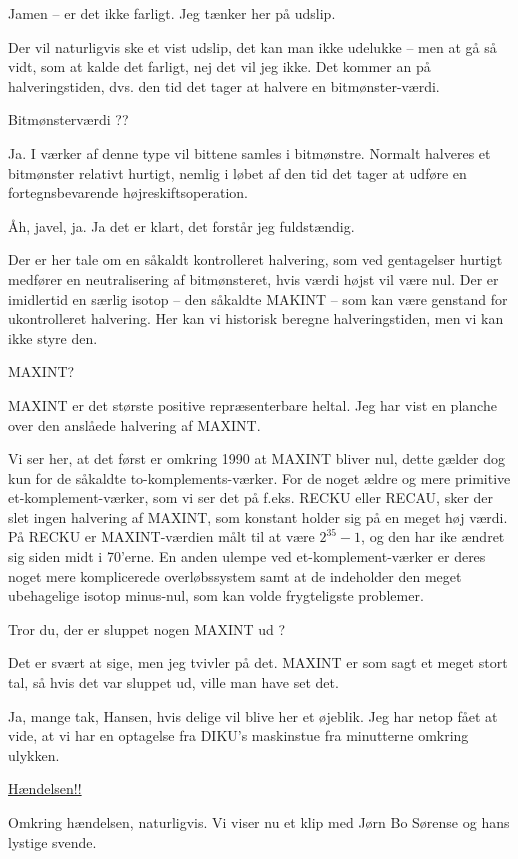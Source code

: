 \documentclass[a4paper,11pt]{article}
\begin{document}
\begin{sketch}
 Jamen -- er det ikke farligt. Jeg tænker her på udslip.

 Der vil naturligvis ske et vist udslip, det kan man ikke udelukke --
men at gå så vidt, som at kalde det farligt, nej det vil jeg ikke. Det kommer an
på halveringstiden, dvs. den tid det tager at halvere en bitmønster-værdi.

 Bitmønsterværdi ??

 Ja.  I værker af denne type vil bittene samles i bitmønstre. Normalt
halveres et bitmønster relativt hurtigt, nemlig i løbet af den tid det tager at
udføre en fortegnsbevarende højreskiftsoperation.

 Åh, javel, ja. Ja det er klart, det forstår jeg fuldstændig.

 Der er her tale om en såkaldt kontrolleret halvering, som ved
gentagelser hurtigt medfører en neutralisering af bitmønsteret, hvis værdi højst
vil være nul.  Der er imidlertid en særlig isotop -- den såkaldte MAKINT -- som
kan være genstand for ukontrolleret halvering.  Her kan vi historisk beregne
halveringstiden, men vi kan ikke styre den.

 MAXINT?

 MAXINT er det største positive repræsenterbare heltal.  Jeg har vist en
planche over den anslåede halvering af MAXINT.


 Vi ser her, at det først er omkring 1990 at MAXINT bliver nul, dette
gælder dog kun for de såkaldte to-komplements-værker.  For de noget ældre og
mere primitive et-komplement-værker, som vi ser det på f.eks. RECKU eller RECAU,
sker der slet ingen halvering af MAXINT, som konstant holder sig på en meget høj
værdi.  På RECKU er MAXINT-værdien målt til at være $2^{35} - 1$, og den har ike
ændret sig siden midt i 70'erne.  En anden ulempe ved et-komplement-værker er
deres noget mere komplicerede overløbssystem samt at de indeholder den meget
ubehagelige isotop minus-nul, som kan volde frygteligste problemer.

 Tror du, der er sluppet nogen MAXINT ud ?

 Det er svært at sige, men jeg tvivler på det.  MAXINT er som sagt et
meget stort tal, så hvis det var sluppet ud, ville man have set det.

 Ja, mange tak, Hansen, hvis delige vil blive her et øjeblik. Jeg har
netop fået at vide, at vi har en optagelse fra DIKU's maskinstue fra minutterne
omkring ulykken.

 \underline{Hændelsen!!}

 Omkring hændelsen, naturligvis. Vi viser nu et klip med Jørn Bo Sørense
og hans lystige svende.

\end{sketch}
\end{document}
